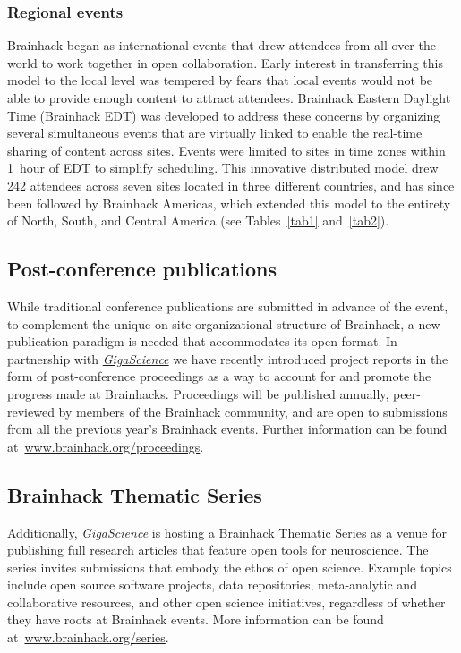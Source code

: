 \documentclass[11pt]{bmc_article_s50}
\begin{document}
\subsubsection*{Regional events}

Brainhack began as international events that drew attendees from all over the world to work together in open collaboration. Early interest %
in transferring this model to the local level was tempered by fears that local events would not be able to provide enough content to attract attendees. Brainhack Eastern Daylight Time (Brainhack EDT) was developed to address these concerns by organizing several simultaneous events that are virtually linked to enable the real-time sharing of content across sites. Events were limited to sites in time zones within %
1~hour of %
EDT to simplify scheduling. This innovative distributed model drew 242 attendees across seven sites located in three different countries, and has since been followed by Brainhack Americas, which extended this model to the entirety of North, South, and Central America (see Tables~\ref{tab1} and~\ref{tab2}).

\subsection*{Post-conference publications}

While traditional conference publications are submitted in advance of the event, to complement the unique on-site organizational structure of Brainhack, a new publication paradigm is needed that accommodates its open format. In partnership with \href{http://www.gigasciencejournal.com/}{\emph{GigaScience}} we have recently introduced project reports in the form of {post-conference proceedings} as a way to account for and promote the progress made at Brainhacks. Proceedings will be published annually, peer-reviewed by members of the Brainhack community, and are open to submissions from all the previous year's Brainhack events. Further information can be found at~\href{http://brainhack.org/proceedings}{www.brainhack.org/proceedings}. 

\subsection*{Brainhack Thematic Series}

Additionally, \href{http://www.gigasciencejournal.com/}{\emph{GigaScience}} is hosting a {Brainhack Thematic Series} as a venue for publishing full research articles that feature open tools for neuroscience. The series invites submissions that embody the ethos of open science. Example topics include open source software projects, data repositories, meta-analytic and collaborative resources, and other open science initiatives, %
 regardless of whether they have roots at Brainhack events. More information can be found at~\href{http://brainhack.org/series/}{www.brainhack.org/series}.
\end{document}

